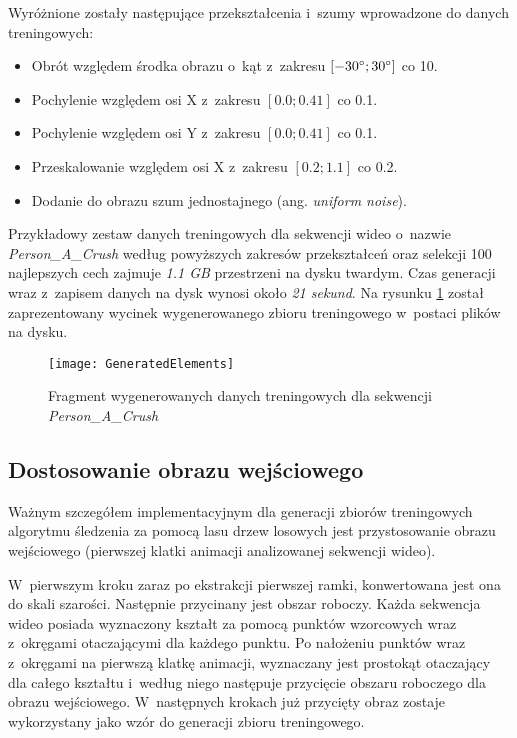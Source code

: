       Wyróżnione zostały następujące przekształcenia i~szumy wprowadzone do danych treningowych:

        \begin{itemize}
          \item Obrót względem środka obrazu o~kąt z~zakresu $[-30^{\circ}\protect; 30^{\circ}\protect]$ co 10\degree.
          \item Pochylenie względem osi X z~zakresu $[0.0; 0.41]$ co 0.1.
          \item Pochylenie względem osi Y z~zakresu $[0.0; 0.41]$ co 0.1.
          \item Przeskalowanie względem osi X z~zakresu $[0.2; 1.1]$ co 0.2.
          \item Dodanie do obrazu szum jednostajnego (ang. \textit{uniform noise}).
        \end{itemize}

      Przykładowy zestaw danych treningowych dla sekwencji wideo o~nazwie \textit{Person\_A\_Crush} według powyższych zakresów przekształceń oraz selekcji 100 najlepszych cech zajmuje \textit{1.1 GB} przestrzeni na dysku twardym. Czas generacji wraz z~zapisem danych na dysk wynosi około \textit{21 sekund}. Na rysunku \ref{fig:GeneratedElements} został zaprezentowany wycinek wygenerowanego zbioru treningowego w~postaci plików na dysku.

        \begin{figure}[!ht]
          \centering
          \texttt{[image: GeneratedElements]}
          \caption[Fragment wygenerowanych danych treningowych]
                  {Fragment wygenerowanych danych treningowych dla sekwencji \\\textit{Person\_A\_Crush}}
          \label{fig:GeneratedElements}
        \end{figure}

    \subsection{Dostosowanie obrazu wejściowego}\label{Subsection_AdjustFirstFrame}

      Ważnym szczegółem implementacyjnym dla generacji zbiorów treningowych algorytmu śledzenia za pomocą lasu drzew losowych jest przystosowanie obrazu wejściowego (pierwszej klatki animacji analizowanej sekwencji wideo).

      W~pierwszym kroku zaraz po ekstrakcji pierwszej ramki, konwertowana jest ona do skali szarości. Następnie przycinany jest obszar roboczy. Każda sekwencja wideo posiada wyznaczony kształt za pomocą punktów wzorcowych wraz z~okręgami otaczającymi dla każdego punktu. Po nałożeniu punktów wraz z~okręgami na pierwszą klatkę animacji, wyznaczany jest prostokąt otaczający dla całego kształtu i~według niego następuje przycięcie obszaru roboczego dla obrazu wejściowego. W~następnych krokach już przycięty obraz zostaje wykorzystany jako wzór do generacji zbioru treningowego.

